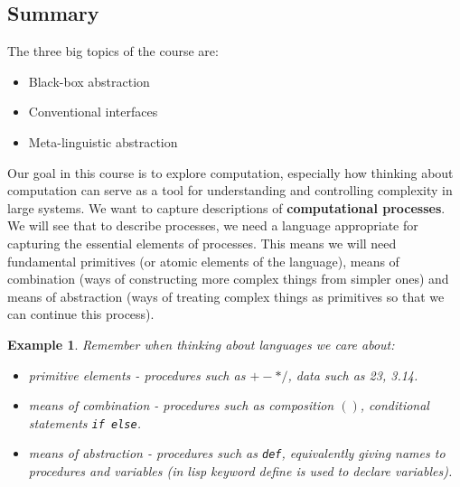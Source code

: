 \documentclass[a4paper,twoside]{article}
\newtheorem{example}[theorem]{Example}
\numberwithin{equation}{section}
\begin{document}
\subsection{Summary}
The three big topics of the course are:
\begin{itemize}
    \item Black-box abstraction
    \item Conventional interfaces
    \item Meta-linguistic abstraction
\end{itemize}
Our goal in this course is to explore computation, especially how thinking about computation can
serve as a tool for understanding and controlling complexity in large systems. We want to capture
descriptions of \textbf{computational processes}. We will see that to describe processes, we need
a language appropriate for capturing the essential elements of processes. This means we will need
fundamental primitives (or atomic elements of the language), means of combination (ways of constructing
more complex things from simpler ones) and means of abstraction (ways of treating complex things as
primitives so that we can continue this process).
\begin{example}
    Remember when thinking about languages we care about:
    \begin{itemize}
        \item primitive elements - procedures such as $+ - * /$, data such as 23, 3.14.
        \item means of combination - procedures such as  composition $()$, conditional statements \texttt{if else}.
        \item means of abstraction - procedures such as \texttt{def}, equivalently giving names
              to procedures and variables (in lisp keyword define is used to declare variables).
    \end{itemize}
\end{example}
\end{document}
